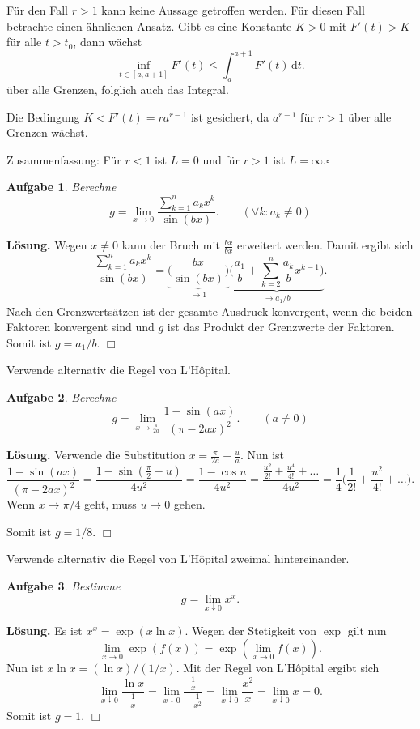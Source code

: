 \documentclass[a4paper,10pt,fleqn,twoside]{scrartcl}
\numberwithin{equation}{section}
\newcommand{\strong}[1]{{\normalfont\sffamily\bfseries #1}}
\renewcommand{\qedsymbol}{\ensuremath{\square}}
\theoremstyle{Aufgabe}
\newtheorem{Aufgabe}{\sffamily Aufgabe}[section]
\begin{document}
Für den Fall $r>1$ kann keine Aussage getroffen werden. Für diesen
Fall betrachte einen ähnlichen Ansatz. Gibt es eine Konstante $K>0$
mit $F'(t)>K$ für alle $t>t_0$, dann wächst%
\[\inf_{t\in[a,a+1]}F'(t) \le \int_a^{a+1} F'(t)\,\mathrm dt.\]
über alle Grenzen, folglich auch das Integral.

Die Bedingung $K<F'(t)=ra^{r-1}$ ist gesichert, da $a^{r-1}$
für $r>1$ über alle Grenzen wächst.

Zusammenfassung: Für $r<1$ ist $L=0$ und
für $r>1$ ist $L=\infty$.\;\qedsymbol

\begin{Aufgabe}
Berechne
\[g = \lim_{x\to 0}\frac{\sum_{k=1}^n a_k x^k}{\sin(bx)}.
\qquad(\forall k\colon a_k\ne 0)\]
\end{Aufgabe}
\noindent
\strong{Lösung.}
Wegen $x\ne 0$ kann der Bruch mit $\frac{bx}{bx}$ erweitert
werden. Damit ergibt sich%
\[
\frac{\sum_{k=1}^n a_k x^k}{\sin(bx)}
= \underbrace{\bigg(\frac{bx}{\sin(bx)}\bigg)}_{\to 1}
\underbrace{\bigg(\frac{a_1}{b}+\sum_{k=2}^n\frac{a_k}{b}x^{k-1}\bigg)}_{\to a_1/b}.
\]
Nach den Grenzwertsätzen ist der gesamte Ausdruck konvergent, wenn
die beiden Faktoren konvergent sind und $g$ ist das Produkt
der Grenzwerte der Faktoren. Somit ist $g=a_1/b$. $\Box$

Verwende alternativ die Regel von L'Hôpital.

\begin{Aufgabe}
Berechne
\[g = \lim_{x\to\frac{\pi}{2a}} \frac{1-\sin(ax)}{(\pi-2ax)^2}.
\qquad(a\ne 0)\]
\end{Aufgabe}
\noindent
\strong{Lösung.}
Verwende die Substitution $x=\frac{\pi}{2a}-\frac{u}{a}$.
Nun ist%
\[
\frac{1-\sin(ax)}{(\pi-2ax)^2}
= \frac{1-\sin(\frac{\pi}{2}-u)}{4u^2}
= \frac{1-\cos u}{4u^2}
= \frac{\frac{u^2}{2!}+\frac{u^4}{4!}+\ldots}{4u^2}
= \frac{1}{4} \Big(\frac{1}{2!}+\frac{u^2}{4!}+\ldots\Big).
\]
Wenn $x\to\pi/4$ geht, muss $u\to 0$ gehen.

Somit ist $g=1/8$. $\Box$

Verwende alternativ die Regel von L'Hôpital zweimal hintereinander.

\begin{Aufgabe}
Bestimme
\[g=\lim_{x\downarrow 0} x^x.\]
\end{Aufgabe}
\noindent
\strong{Lösung.} Es ist $x^x=\exp(x\ln x)$.
Wegen der Stetigkeit von $\exp$ gilt nun
\begin{equation}
\lim_{x\to 0}\exp(f(x)) = \exp(\lim_{x\to 0} f(x)).
\end{equation}
Nun ist $x\ln x = (\ln x)/(1/x).$
Mit der Regel von L'Hôpital ergibt sich
\begin{equation}
\lim_{x\downarrow 0} \frac{\ln x}{\frac{1}{x}}
= \lim_{x\downarrow 0} \frac{\frac{1}{x}}{-\frac{1}{x^2}}
= \lim_{x\downarrow 0}\frac{x^2}{x}
= \lim_{x\downarrow 0} x = 0.
\end{equation}
Somit ist $g=1$. $\Box$
\end{document}
